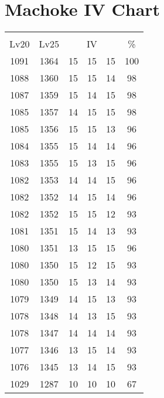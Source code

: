 \documentclass{article}%
\begin{document}
%
\normalsize%
\section{Machoke IV Chart}%
\label{sec:Machoke IV Chart}%
\renewcommand{\arraystretch}{1.5}%
\begin{tabular}{|c|c|c|c|c|c|}%
\hline%
\multicolumn{6}{|c|}{\textcolor{white}{ 
\linebreak{Machoke}
}%
\cellcolor{black}}\\%
\multicolumn{1}{|c}{Lv20}&\multicolumn{1}{c|}{Lv25}&\multicolumn{3}{c|}{IV}&\multicolumn{1}{|c|}{\%}\\%
\hline%
\rowcolor{color100}%
1091&1364&15&15&15&100\\%
\hline%
\rowcolor{color98}%
1088&1360&15&15&14&98\\%
\hline%
\rowcolor{color98}%
1087&1359&15&14&15&98\\%
\hline%
\rowcolor{color98}%
1085&1357&14&15&15&98\\%
\hline%
\rowcolor{color96}%
1085&1356&15&15&13&96\\%
\hline%
\rowcolor{color96}%
1084&1355&15&14&14&96\\%
\hline%
\rowcolor{color96}%
1083&1355&15&13&15&96\\%
\hline%
\rowcolor{color96}%
1082&1353&14&14&15&96\\%
\hline%
\rowcolor{color96}%
1082&1352&14&15&14&96\\%
\hline%
\rowcolor{color93}%
1082&1352&15&15&12&93\\%
\hline%
\rowcolor{color93}%
1081&1351&15&14&13&93\\%
\hline%
\rowcolor{color96}%
1080&1351&13&15&15&96\\%
\hline%
\rowcolor{color93}%
1080&1350&15&12&15&93\\%
\hline%
\rowcolor{color93}%
1080&1350&15&13&14&93\\%
\hline%
\rowcolor{color93}%
1079&1349&14&15&13&93\\%
\hline%
\rowcolor{color93}%
1078&1348&14&13&15&93\\%
\hline%
\rowcolor{color93}%
1078&1347&14&14&14&93\\%
\hline%
\rowcolor{color93}%
1077&1346&13&15&14&93\\%
\hline%
\rowcolor{color93}%
1076&1345&13&14&15&93\\%
\hline%
\rowcolor{color91}%
1029&1287&10&10&10&67\\%
\end{tabular}

%
\end{document}
